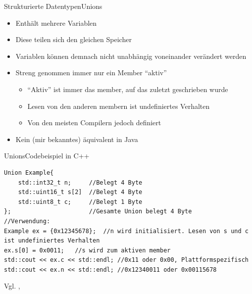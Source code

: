 \begin{frame}{Strukturierte Datentypen}{Unions}
    \begin{itemize}
        \item Enthält mehrere Variablen
        \item Diese teilen sich den gleichen Speicher
        \item Variablen können demnach nicht unabhängig voneinander verändert werden
        \item Streng genommen immer nur ein Member "`aktiv"'
        \begin{itemize}
            \item "`Aktiv"' ist immer das member, auf das zuletzt geschrieben wurde
            \item Lesen von den anderen membern ist undefiniertes Verhalten
            \item Von den meisten Compilern jedoch definiert
        \end{itemize}
        \item Kein (mir bekanntes) äquivalent in Java
    \end{itemize}
\end{frame}

\begin{frame}[fragile]{Unions}{Codebeispiel in C++}
\lstset{style=cpp}
\begin{lstlisting}
Union Example{
    std::int32_t n;     //Belegt 4 Byte
    std::uint16_t s[2]  //Belegt 4 Byte
    std::uint8_t c;     //Belegt 1 Byte
};                      //Gesamte Union belegt 4 Byte
//Verwendung:
Example ex = {0x12345678};  //n wird initialisiert. Lesen von s und c ist undefiniertes Verhalten
ex.s[0] = 0x0011;   //s wird zum aktiven member
std::cout << ex.c << std::endl; //0x11 oder 0x00, Plattformspezifisch
std::cout << ex.n << std::endl; //0x12340011 oder 0x00115678
\end{lstlisting}

Vgl. \cite{msdn:union}, \cite{cppref:union}
\end{frame}